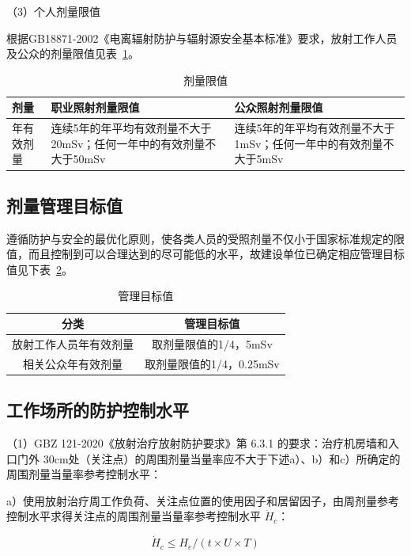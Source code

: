 （3）个人剂量限值

根据GB18871-2002《电离辐射防护与辐射源安全基本标准》要求，放射工作人员及公众的剂量限值见表~\ref{tab:ch1-6-t1-0d487f75}。

\begin{table}[H]
\centering
\caption{剂量限值}
\label{tab:ch1-6-t1-0d487f75}
\begin{tabular}{|m{3cm}|m{6cm}|m{6cm}|}
\hline
剂量 & 职业照射剂量限值 & 公众照射剂量限值 \\
\hline
年有效剂量 & 连续5年的年平均有效剂量不大于20mSv；任何一年中的有效剂量不大于50mSv & 连续5年的年平均有效剂量不大于1mSv；任何一年中的有效剂量不大于5mSv \\
\hline
\end{tabular}
\end{table}

\subsection{剂量管理目标值}

遵循防护与安全的最优化原则，使各类人员的受照剂量不仅小于国家标准规定的限值，而且控制到可以合理达到的尽可能低的水平，故建设单位已确定相应管理目标值见下表~\ref{tab:ch1-6-t2-5e9dafeb}。

\begin{table}[H]
\centering
\caption{管理目标值}
\label{tab:ch1-6-t2-5e9dafeb}
\begin{tabular}{|c|c|}
\hline
分类 & 管理目标值 \\
\hline
放射工作人员年有效剂量 & 取剂量限值的1/4，5mSv \\
\hline
相关公众年有效剂量 & 取剂量限值的1/4，0.25mSv \\
\hline
\end{tabular}
\end{table}

\subsection{工作场所的防护控制水平}

（1）GBZ 121-2020《放射治疗放射防护要求》第 6.3.1 的要求：治疗机房墙和入口门外 $3 0 \mathrm { c m }$处（关注点）的周围剂量当量率应不大于下述a）、b）和c）所确定的周围剂量当量率参考控制水平：

a）使用放射治疗周工作负荷、关注点位置的使用因子和居留因子，由周剂量参考控制水平求得关注点的周围剂量当量率参考控制水平 $\dot { H } _ { c }$：

\begin{equation}
\dot{H}_c\leq H_e /(t\times U\times T)
\end{equation}


